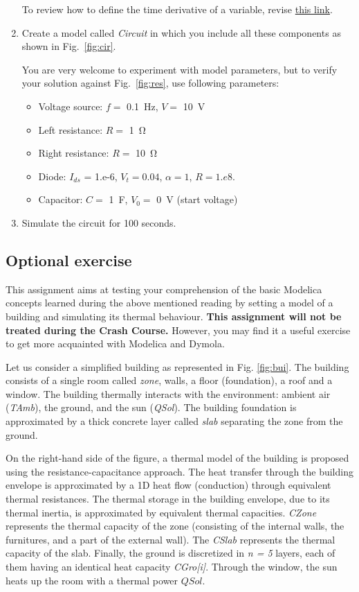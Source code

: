 \documentclass[10pt,a4paper]{article}
\begin{document}
\begin{enumerate}
	To review how to define the time derivative of a variable, revise 
	\href{https://mbe.modelica.university/behavior/equations/first_order/}{this link}.
	\item Create a model called \textit{Circuit} in which you include all these components as shown in Fig.~\ref{fig:cir}. 
	
	You are very welcome to experiment with model parameters, but to verify your solution against Fig.~\ref{fig:res}, use following parameters:
	\begin{itemize}
		\item Voltage source: $f =$ \SI{0.1}{\hertz}, $V =$ \SI{10}{\volt}
		\item Left resistance: $R =$ \SI{1}{\ohm}
		\item Right resistance: $R =$ \SI{10}{\ohm}
		\item Diode: $I_{ds}$ = 1.e-6, $V_t=0.04$, $\alpha=1$, $R=1.e8$.
		\item Capacitor: $C =$ \SI{1}{\farad}, $V_0 =$ \SI{0}{\volt} (start voltage)
	\end{itemize}
	\item Simulate the circuit for 100 seconds.
\end{enumerate}

\vspace{15 mm}

\subsection*{Optional exercise}
This assignment aims at testing your comprehension of the basic Modelica concepts learned during the above mentioned reading by setting a model of a building and simulating its thermal behaviour. \textbf{This assignment will not be treated during the Crash Course.} However, you may find it a useful exercise to get more acquainted with Modelica and Dymola.

Let us consider a simplified building as represented in Fig. \ref{fig:bui}. The building consists of a single room called \textit{zone}, walls, a floor (foundation), a roof and a window. The building thermally interacts with the environment: ambient air (\textit{TAmb}), the ground, and the sun (\textit{QSol}). The building foundation is approximated by a thick concrete layer called \textit{slab} separating the zone from the ground. 

On the right-hand side of the figure, a thermal model of the building is proposed using the resistance-capacitance approach. The heat transfer through the building envelope is approximated by a 1D heat flow (conduction) through equivalent thermal resistances. The thermal storage in the building envelope, due to its thermal inertia, is approximated by equivalent thermal capacities. \textit{CZone} represents the thermal capacity of the zone (consisting of the internal walls, the furnitures, and a part of the external wall). The \textit{CSlab} represents the thermal capacity of the slab. Finally, the ground is discretized in \textit{n = 5} layers, each of them having an identical heat capacity \textit{CGro[i]}. Through the window, the sun heats up the room with a thermal power $QSol$. 
\vspace{15 mm}
\end{document}
